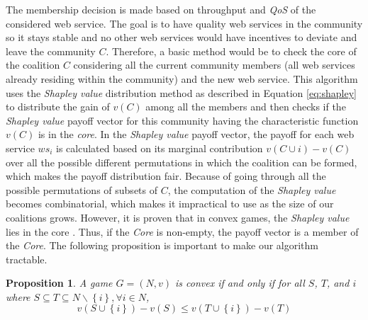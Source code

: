 \documentclass[10pt,journal,cspaper,compsoc]{IEEEtran}
\begin{document}
The membership decision is made based on throughput and \emph{QoS}
of the considered web service. The goal is to have quality web
services in the community so it stays stable and no other web
services would have incentives to deviate and leave the community
$C$. Therefore, a basic method would be to check the core of the
coalition $C$ considering all the current community members (all
web services already residing within the community) and the new
web service. This algorithm uses the \emph{Shapley value}
distribution method as described in Equation \ref{eq:shapley} to
distribute the gain of $v(C)$ among all the members and then
checks if the \emph{Shapley value} payoff vector for this
community having the characteristic function $v(C)$ is in the
\emph{core}. In the \emph{Shapley value} payoff vector, the payoff
for each web service $ws_i$ is calculated based on its marginal
contribution $v(C \cup {i}) - v(C)$ over all the possible
different permutations in which the coalition can be formed, which
makes the payoff distribution fair. Because of going through all
the possible permutations of subsets of $C$, the computation of
the \emph{Shapley value} becomes combinatorial, which makes it
impractical to use as the size of our coalitions grows. However,
it is proven that in convex games, the \emph{Shapley value} lies
in the core \cite{DBLP:conf/ijcai/GrecoMPS11, myerson1991game}.
Thus, if the \emph{Core} is non-empty, the payoff vector is a
member of the \emph{Core}. The following proposition is important
to make our algorithm tractable.


\newtheorem{theorem}{Proposition}
\begin{theorem}\label{proposition1}
A game $G =(N, v)$ is convex if and only if for all $S$, $T$, and
$i$ where $S \subseteq T \subseteq N \backslash \left\{i\right\},
\forall i \in N$,
\begin{equation}\label{eq:convex_snow}
v(S \cup \left\{i\right\}) - v(S) \leq v (T \cup \left\{i\right\})
- v(T)
\end{equation}
\end{theorem}

\end{document}
